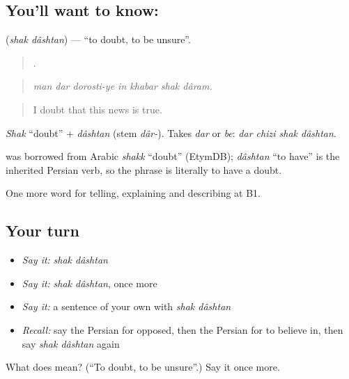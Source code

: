 \subsection*{You'll want to know:  }
\textbf{ } (\emph{shak dâshtan}) — \textquotedblleft{}to doubt, to be unsure\textquotedblright{}.

\begin{quote}
      .
\end{quote}

\begin{quote}
\emph{man dar dorosti-ye in khabar shak dâram.}
\end{quote}

\begin{quote}
I doubt that this news is true.
\end{quote}

\emph{Shak} \textquotedblleft{}doubt\textquotedblright{} + \emph{dâshtan} (stem \emph{dâr-}). Takes \emph{dar} or \emph{be}: \emph{dar chizi shak dâshtan}.

\begin{cousinweb}
\textbf{} was borrowed from Arabic \emph{shakk} \textquotedblleft{}doubt\textquotedblright{} (EtymDB); \emph{dâshtan} \textquotedblleft{}to have\textquotedblright{} is the inherited Persian verb, so the phrase is literally to have a doubt.
\end{cousinweb}

\begin{grammarlens}[title={What you've built}]
One more word for telling, explaining and describing at B1.
\end{grammarlens}

\subsection*{Your turn}
\begin{itemize}
\raggedright
  \item \emph{Say it:} \emph{shak dâshtan}
  \item \emph{Say it:} \emph{shak dâshtan}, once more
  \item \emph{Say it:} a sentence of your own with \emph{shak dâshtan}
  \item \emph{Recall:} say the Persian for opposed, then the Persian for to believe in, then say \emph{shak dâshtan} again
\end{itemize}

\begin{tcolorbox}[breakable,colback=teal!4,colframe=teal!35!black,title={Before you move on}]
What does   mean? (\textquotedblleft{}To doubt, to be unsure\textquotedblright{}.) Say it once more.
\end{tcolorbox}
